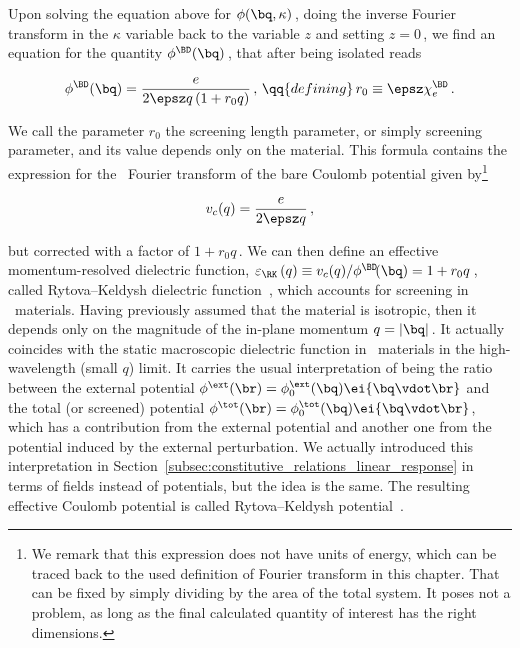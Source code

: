 \noindent Upon solving the equation above for $\phi(\bq,\kappa)$\,, doing the inverse Fourier transform in the $\kappa$ variable back to the variable $z$ and setting $z=0$\,, we find an equation for the quantity $\phi^\BD(\bq)$\,, that after being isolated reads

\begin{equation}
\label{eq:RK_potential_momentum}
    \phi^\BD(\bq) = \frac{e}{2\epsz q\left(1+r_0 q\right)}\,,\,\qq{defining}\,r_0 \equiv \epsz\chi_{e}^\BD\,.
\end{equation}

\noindent We call the parameter $r_0$ the screening length parameter, or simply screening parameter, and its value depends only on the material.
This formula contains the expression for the \bd~Fourier transform of the bare Coulomb potential given by\footnote{We remark that this expression does not have units of energy, which can be traced back to the used definition of Fourier transform in this chapter. That can be fixed by simply dividing by the area of the total system. It poses not a problem, as long as the final calculated quantity of interest has the right dimensions.}

\begin{equation}
    v_{c}(q)=\frac{e}{2\epsz q}\,,
\end{equation}

\noindent but corrected with a factor of $1+r_0 q$\,.
We can then define an effective momentum-resolved dielectric function, $\varepsilon_\RK\left(q\right) \equiv v_{c}(q)/\phi^\BD\!(\bq) = 1+r_0 q$\,, called Rytova--Keldysh dielectric function~\cite{Rytova_1967}, which accounts for screening in \bd~materials.
Having previously assumed that the material is isotropic, then it depends only on the magnitude of the in-plane momentum $q = |\bq|$\,.
It actually coincides with the static macroscopic dielectric function in \bd~materials in the high-wavelength (small $q$) limit.
It carries the usual interpretation of being the ratio between the external potential $\phi^\ext (\br)=\phi_0^\ext(\bq) \ei{\bq \vdot \br}$ and the total (or screened) potential $\phi^\tot (\br)=\phi_0^\tot\text{\ensuremath{(\bq)}}\ei{\bq \vdot \br}$, which has a contribution from the external potential and another one from the potential induced by the external perturbation.
We actually introduced this interpretation in Section~\ref{subsec:constitutive_relations_linear_response} in terms of fields instead of potentials, but the idea is the same.
The resulting effective Coulomb potential is called Rytova--Keldysh potential~\cite{Rytova_1967}.

